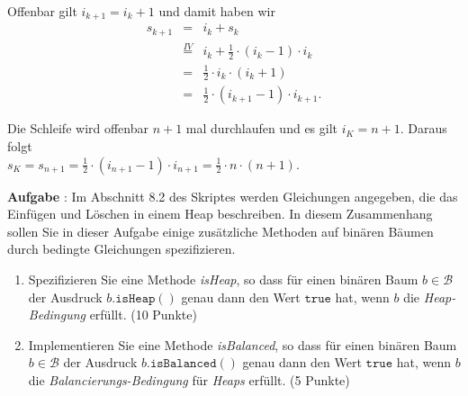 \documentclass{article}
\newcounter{aufgabe}
\newcommand{\exercise}{\vspace*{0.2cm}
\stepcounter{aufgabe}

\noindent
\textbf{Aufgabe \arabic{aufgabe}}: }
\begin{document}
\begin{enumerate}
\begin{enumerate}
            Offenbar gilt $i_{k+1} = i_k + 1$ und damit haben wir 
            \begin{eqnarray*}
              s_{k+1} & = & i_k + s_k \\
            & \stackrel{IV}{=} & i_k + \frac{1}{2} \cdot (i_{k}-1) \cdot i_k \\
            & = & \frac{1}{2} \cdot i_{k} \cdot (i_k + 1) \\
            & = & \frac{1}{2} \cdot (i_{k+1} - 1) \cdot i_{k+1}.
            \end{eqnarray*}
      \end{enumerate}
      Die Schleife wird offenbar $n+1$ mal durchlaufen und es gilt $i_K = n+1$.  Daraus folgt
      \\[0.2cm]
      \hspace*{1.3cm}
      $s_K = s_{n+1} = \frac{1}{2} \cdot (i_{n+1} - 1) \cdot i_{n+1} = \frac{1}{2} \cdot n \cdot (n+1)$.
\end{enumerate}
\vspace{0.3cm}

\exercise
Im Abschnitt 8.2 des Skriptes
werden Gleichungen angegeben, die das Einf\"ugen und L\"oschen in einem Heap beschreiben.
In diesem Zusammenhang sollen Sie in dieser Aufgabe  einige zus\"atzliche Methoden auf
bin\"aren B\"aumen durch bedingte Gleichungen spezifizieren.
\begin{enumerate}
\item Spezifizieren Sie eine Methode \textsl{isHeap}, so
      dass f\"ur einen bin\"aren Baum $b \in \mathcal{B}$ der Ausdruck 
      $b.\mathtt{isHeap}()$ genau dann den Wert $\mathtt{true}$ hat, wenn $b$ die
      \emph{Heap-Bedingung} erf\"ullt.  \hspace*{\fill} (10 Punkte)
\item Implementieren Sie eine Methode \textsl{isBalanced}, so
      dass f\"ur einen bin\"aren Baum $b \in \mathcal{B}$ der Ausdruck 
      $b.\mathtt{isBalanced}()$ genau dann den Wert $\mathtt{true}$ hat, wenn $b$ die
      \emph{Balancierungs-Bedingung} f\"ur \emph{Heaps} erf\"ullt.  
      \hspace*{\fill} (5 Punkte)
\end{enumerate}
\vspace{0.3cm}
\end{document}

